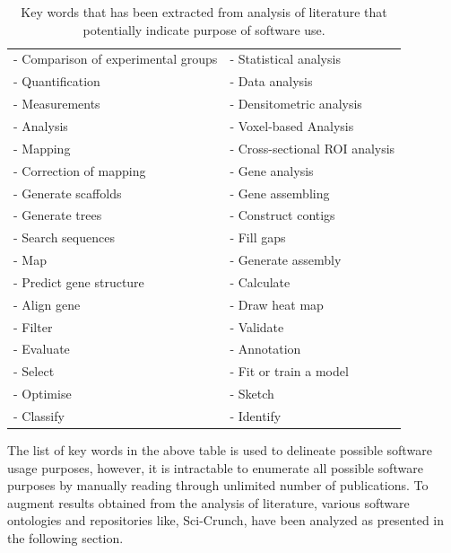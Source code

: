\begin{table}[h!]
	\begin{center}
		\caption{Key words that has been extracted from analysis of literature that potentially indicate purpose of software use.}
		\label{tab:table1}
		\begin{tabular}{|l|l|} %
			
			\hline
			- Comparison of experimental groups & -	Statistical analysis  \\
			- Quantification & - Data analysis \\
			- Measurements   & - Densitometric analysis \\
			- Analysis       & - Voxel-based Analysis  \\
			- Mapping        & - Cross-sectional ROI analysis \\
			- Correction of mapping  & - Gene analysis     \\
			- Generate scaffolds     & - Gene assembling \\
			- Generate trees         & - Construct contigs \\
			- Search sequences       & - Fill gaps \\
			- Map                    & - Generate assembly \\
			- Predict gene structure & - Calculate \\
			- Align gene             & - Draw heat map \\
			- Filter                 & - Validate \\
			- Evaluate               & - Annotation \\
			- Select                 & - Fit or train a model \\ 
			- Optimise               & - Sketch \\
			- Classify               & - Identify \\
			
			\hline
		\end{tabular}
	\end{center}
\end{table}

The list of key words in the above table is used to delineate possible software usage purposes, however, it is intractable to enumerate all possible software purposes by manually reading through unlimited number of publications. To augment results obtained from the analysis of literature, various software ontologies and repositories like, Sci-Crunch, have been analyzed as presented in the following section. 


